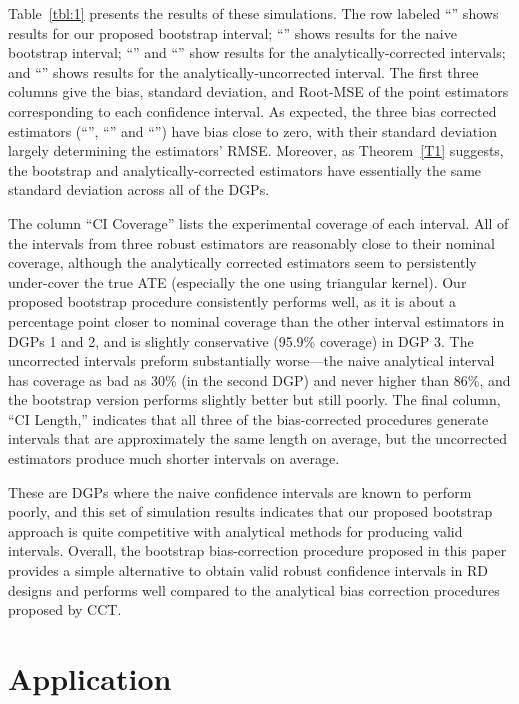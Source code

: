 \documentclass[12pt,fleqn]{article}
\begin{document}
Table~\ref{tbl:1} presents the results of these simulations. The row labeled
``\bootuni'' shows results for our proposed bootstrap interval; ``\bootnaive''
shows results for the naive bootstrap interval; ``\cctuni'' and ``\ccttri'' show
results for the analytically-corrected intervals; and ``\naiveuni'' shows results
for the analytically-uncorrected interval. The first three columns give the bias,
standard deviation, and Root-MSE of the point
estimators corresponding to each confidence interval.  As expected, the three
bias corrected estimators (``\bootuni'', ``\cctuni'' and ``\ccttri'') have
bias close to zero, with their standard deviation largely
determining the estimators' RMSE. Moreover, as Theorem~\ref{T1} suggests, the
bootstrap and analytically-corrected estimators have essentially the same
standard deviation across all of the DGPs.

The column ``CI Coverage'' lists the experimental coverage of each interval.
All of the intervals from three robust estimators are reasonably close to their nominal coverage, although
the analytically corrected estimators seem to persistently under-cover the true
ATE (especially the one using triangular kernel). Our proposed bootstrap
procedure consistently performs well, as it is about a percentage point closer
to nominal coverage than the other interval estimators in DGPs 1 and 2, and is
slightly conservative (95.9\% coverage) in DGP 3. The uncorrected intervals
preform substantially worse---the naive analytical interval has coverage as
bad as 30\% (in the second DGP) and never higher than 86\%, and the bootstrap
version performs slightly better but still poorly. The final column, ``CI Length,''
indicates that all three of the bias-corrected procedures generate intervals that are
approximately the same length on average, but the uncorrected estimators produce
much shorter intervals on average.

These are DGPs where the naive confidence intervals are known to perform poorly,
and this set of simulation results indicates that our proposed bootstrap approach
is quite competitive with analytical methods for producing valid intervals.
Overall, the bootstrap bias-correction procedure proposed in this paper provides
a simple alternative to obtain valid robust confidence intervals in RD designs
and performs well compared to the analytical bias correction procedures proposed
by CCT.

\section{Application}\label{application}
\end{document}

